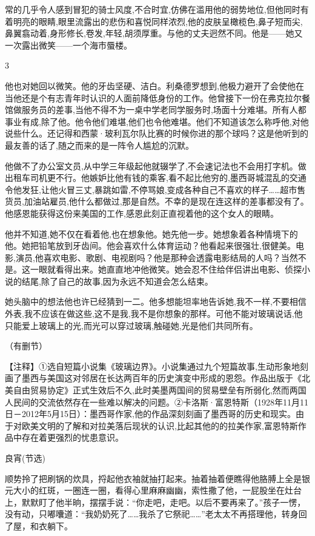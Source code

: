 \documentclass{ctexart}
\newcommand{\blkx}{\vspace*{4\baselineskip} }
\renewcommand{\\}{\par}
\begin{document}
常的几乎令人感到冒犯的骑士风度,不合时宜,仿佛在滥用他的弱势地位,但他同时有着明亮的眼睛,眼里流露出的悲伤和喜悦同样浓烈,他的皮肤呈橄榄色,鼻子短而尖,鼻翼翕动着,身形修长,卷发,年轻,胡须厚重。与他的丈夫迥然不同。他是——她又一次露出微笑——一个海市蜃楼。 \\ \begin{center} 3 \end{center} \\他也对她回以微笑。他的牙齿坚硬、洁白。利桑德罗想到,他极力避开了会使他在当他还是个有志青年时认识的人面前降低身份的工作。他曾接下一份在弗克拉尔餐馆做服务员的差事,当他不得不为一桌中学老同学服务时,场面十分难堪。所有人都事业有成,除了他。他令他们难堪,他们也令他难堪。他们不知道该怎么称呼他,对他说些什么。还记得和西蒙·玻利瓦尔队比赛的时候你进的那个球吗？这是他听到的最友善的话了,随之而来的是一阵令人尴尬的沉默。 \\他做不了办公室文员,从中学三年级起他就辍学了,不会速记法也不会用打字机。做出租车司机更不行。他嫉妒比他有钱的乘客,看不起比他穷的,墨西哥城混乱的交通令他发狂,让他火冒三丈,暴跳如雷,不停骂娘,变成各种自己不喜欢的样子……超市售货员,加油站雇员,他什么都做过,那是自然。不幸的是现在连这样的差事都没有了。他感恩能获得这份来美国的工作,感恩此刻正直视着他的这个女人的眼睛。 \\他并不知道,她不仅在看着他,也在想象他。她先他一步。她想象着各种情境下的他。她把铅笔放到牙齿间。他会喜欢什么体育运动？他看起来很强壮,很健美。电影,演员,他喜欢电影、歌剧、电视剧吗？他是那种会透露电影结局的人吗？当然不是。这一眼就看得出来。她直直地冲他微笑。她会忍不住给伴侣讲出电影、侦探小说的结尾,除了自己的故事,因为永远不知道会怎么结束。\\她头脑中的想法他也许已经猜到一二。他多想能坦率地告诉她,我不一样,不要相信外表,我不应该在做这些,这不是我,我不是你想象的那样。可他不能对玻璃说话,他只能爱上玻璃上的光,而光可以穿过玻璃,触碰她,光是他们共同所有。 \\（有删节）\\【注释】①选自短篇小说集《玻璃边界》。小说集通过九个短篇故事,生动形象地刻画了墨西与美国这对邻居在长达两百年的历史演变中形成的恩怨。作品出版于《北美自由贸易协定》正式生效后不久,此时美墨两国间的贸易壁垒有所弱化,然而两国人民间的交流依然存在一些难以解决的问题。②卡洛斯·富恩特斯（1928年11月11日－2012年5月15日）：墨西哥作家,他的作品深刻刻画了墨西哥的历史和现实。由于对欧美文明的了解和对拉美落后现状的认识,比起其他的的拉美作家,富恩特斯作品中存在着更强烈的忧患意识。
\blkx \begin{center} 良宵(节选) \end{center}\\顺势拎了把刷锅的炊具，捋起他衣袖就抽打起来。抽着抽着便瞧得他胳膊上全是银元大小的红斑，一圈连一圈，看得心里麻麻幽幽，索性撒了他，一屁股坐在灶台上，默默盯了他半晌，摆摆手说：“你走吧，走吧。以后不要再来了。”孩子一愣，没有动，只嘟囔道：“我奶奶死了……我杀了它祭祀……”老太太不再搭理他，转身回了屋，和衣躺下。
\end{document}
